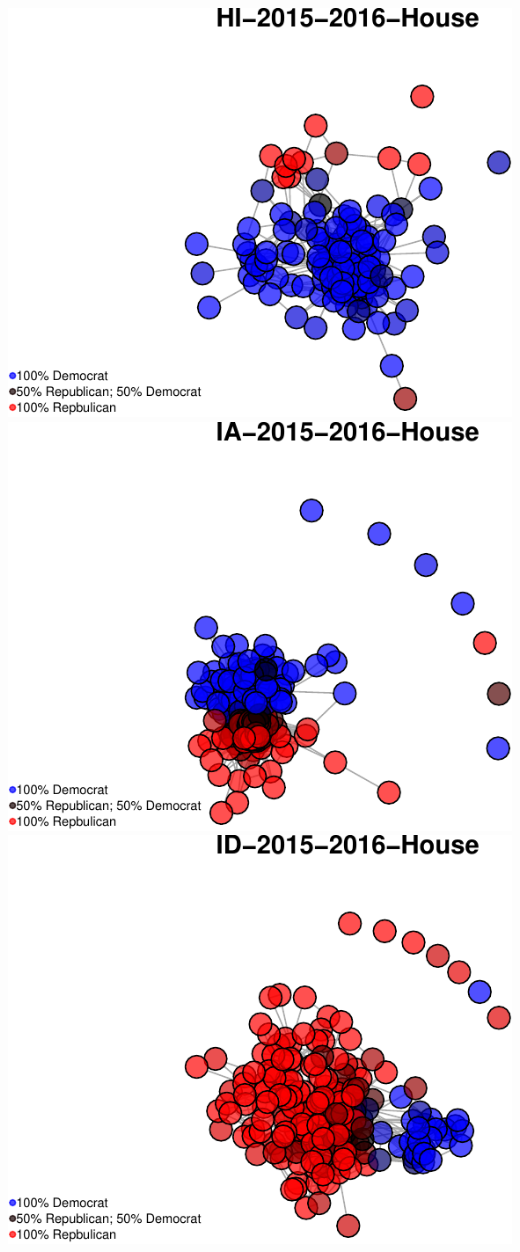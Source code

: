 \documentclass[]{article}
\begin{document}
\includegraphics{Final_Project_RMarkdown_Updated_files/figure-latex/unnamed-chunk-10-10.pdf}
\includegraphics{Final_Project_RMarkdown_Updated_files/figure-latex/unnamed-chunk-10-11.pdf}
\includegraphics{Final_Project_RMarkdown_Updated_files/figure-latex/unnamed-chunk-10-12.pdf}
\end{document}
